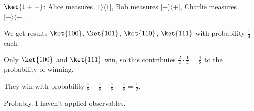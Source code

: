 \documentclass{article}
\newcommand{\ketbra}[2]{|#1\rangle\!\langle #2|}
\begin{document}
\begin{enumerate}
\begin{enumerate}
                $\ket{1+-}$: Alice measures $\ketbra{1}{1}$, Bob measures $\ketbra{+}{+}$, Charlie measures $\ketbra{-}{-}$.

                We get results $\ket{100}$, $\ket{101}$, $\ket{110}$, $\ket{111}$ with probability $\frac{1}{4}$ each.

                Only $\ket{100}$ and $\ket{111}$ win, so this contributes $\frac{2}{4}\cdot\frac{1}{4}=\frac{1}{8}$ to the probability of winning.

                They win with probability $\frac{1}{8}+\frac{1}{8}+\frac{1}{8}+\frac{1}{8}=\frac{1}{2}$.

                Probably. I haven't applied observables.

        \end{enumerate}
\end{enumerate}
\end{document}
